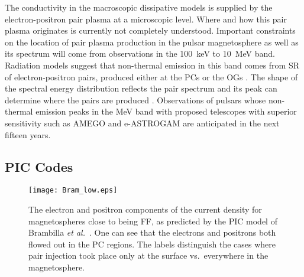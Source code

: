 \documentclass{PoS}
\begin{document}
The conductivity in the macroscopic dissipative models is supplied by the electron-positron pair plasma at a microscopic level. Where and how this pair plasma originates is currently not completely understood. Important constraints on the location of pair plasma production in the pulsar magnetosphere as well as its spectrum will come from observations in the 100~keV to 10~MeV band. Radiation models suggest that non-thermal emission in this band comes from SR of electron-positron pairs, produced either at the PCs \cite{Harding15} or the OGs \cite{Takata08}. The shape of the spectral energy distribution reflects the pair spectrum and its peak can determine where the pairs are produced \cite{DeAngelis17,Harding17}. Observations of pulsars whose non-thermal emission peaks in the MeV band with proposed telescopes with superior sensitivity such as AMEGO \cite{Moiseev2017} and e-ASTROGAM \cite{DeAngelis17} are anticipated in the next fifteen years.


\subsection{PIC Codes}
\begin{figure}[t]
  \begin{center}
  \texttt{[image: Bram\_low.eps]}
  \caption{The electron and positron components of the current density for magnetospheres close to being FF, as predicted by the PIC model of Brambilla \textit{et al.}~\cite{Brambilla18}.  One can see that the electrons and positrons both flowed out in the PC regions. The labels distinguish the cases where pair injection took place only at the surface vs.\ everywhere in the magnetosphere.}
  \label{fig:Bram}
  \end{center}
\end{figure}
\end{document}
